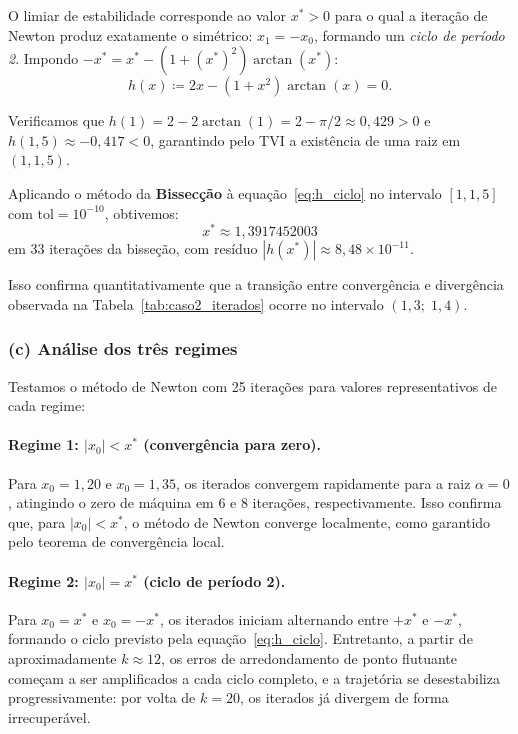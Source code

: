 \documentclass[12pt, a4paper]{article}
\begin{document}
O limiar de estabilidade corresponde ao valor $x^* > 0$ para o qual a iteração de Newton produz exatamente o simétrico: $x_1 = -x_0$, formando um \emph{ciclo de período 2}. Impondo $-x^* = x^* - (1 + (x^*)^2)\arctan(x^*)$:
\begin{equation}
    h(x) \coloneqq 2x - (1 + x^2)\arctan(x) = 0.
    \label{eq:h_ciclo}
\end{equation}

Verificamos que $h(1) = 2 - 2\arctan(1) = 2 - \pi/2 \approx 0{,}429 > 0$ e $h(1{,}5) \approx -0{,}417 < 0$, garantindo pelo TVI a existência de uma raiz em $(1, 1{,}5)$.

Aplicando o método da \textbf{Bissecção} à equação~\eqref{eq:h_ciclo} no intervalo $[1, 1{,}5]$ com $\text{tol} = 10^{-10}$, obtivemos:
\[
    \boxed{x^* \approx 1{,}3917452003}
\]
em 33 iterações da bisseção, com resíduo $|h(x^*)| \approx 8{,}48 \times 10^{-11}$.

Isso confirma quantitativamente que a transição entre convergência e divergência observada na Tabela~\ref{tab:caso2_iterados} ocorre no intervalo $(1{,}3;\; 1{,}4)$.


\subsubsection*{(c) Análise dos três regimes}

Testamos o método de Newton com 25 iterações para valores representativos de cada regime:

\paragraph{Regime 1: $|x_0| < x^*$ (convergência para zero).}
Para $x_0 = 1{,}20$ e $x_0 = 1{,}35$, os iterados convergem rapidamente para a raiz $\alpha = 0$, atingindo o zero de máquina em 6 e 8 iterações, respectivamente.
Isso confirma que, para $|x_0| < x^*$, o método de Newton converge localmente, como garantido pelo teorema de convergência local.

\paragraph{Regime 2: $|x_0| = x^*$ (ciclo de período 2).}
Para $x_0 = x^*$ e $x_0 = -x^*$, os iterados iniciam alternando entre $+x^*$ e $-x^*$, formando o ciclo previsto pela equação~\eqref{eq:h_ciclo}. Entretanto, a partir de aproximadamente $k \approx 12$, os erros de arredondamento de ponto flutuante começam a ser amplificados a cada ciclo completo, e a trajetória se desestabiliza progressivamente: por volta de $k = 20$, os iterados já divergem de forma irrecuperável.
\end{document}
